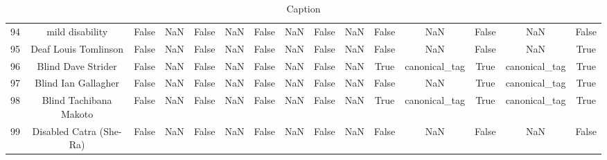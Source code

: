 \begin{table}[h!]
{\begin{tabular}{|c|c|c|c|c|c|c|c|c|c|c|c|c|c|c|}
         94 &                                   mild disability &                          False &                       NaN &                          False &                       NaN &                          False &                       NaN &                          False &                       NaN &                          False &                       NaN &                          False &                       NaN &                          False \\
         95 &                              Deaf Louis Tomlinson &                          False &                       NaN &                          False &                       NaN &                          False &                       NaN &                          False &                       NaN &                          False &                       NaN &                          False &                       NaN &                           True \\
         96 &                                Blind Dave Strider &                          False &                       NaN &                          False &                       NaN &                          False &                       NaN &                          False &                       NaN &                           True &             canonical\_tag &                           True &             canonical\_tag &                           True \\
         97 &                               Blind Ian Gallagher &                          False &                       NaN &                          False &                       NaN &                          False &                       NaN &                          False &                       NaN &                          False &                       NaN &                           True &             canonical\_tag &                           True \\
         98 &                            Blind Tachibana Makoto &                          False &                       NaN &                          False &                       NaN &                          False &                       NaN &                          False &                       NaN &                           True &             canonical\_tag &                           True &             canonical\_tag &                           True \\
         99 &                           Disabled Catra (She-Ra) &                          False &                       NaN &                          False &                       NaN &                          False &                       NaN &                          False &                       NaN &                          False &                       NaN &                          False &                       NaN &                          False \\
\hline
\end{tabular}}
 \caption{Caption}
 \label{tab:my_label}
\end{table}
